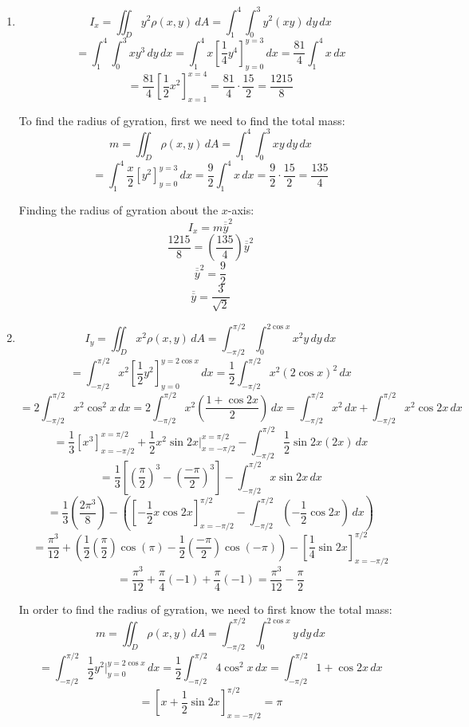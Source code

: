 \begin{Answer}[ref = moment]
\begin{enumerate}
\item $$I_x = \iint_{\textit{D}} y^2 \rho(x, y)\,dA = \int_1^4 \int_0^3 y^2 (xy) \,dy\,dx$$
$$= \int_1^4 \int_0^3 xy^3\,dy\,dx = \int_1^4 x \left[ \frac{1}{4} y^4 \right]_{y = 0}^{y = 3}\,dx = \frac{81}{4} \int_1^4 x\,dx$$
$$= \frac{81}{4} \left[ \frac{1}{2} x^2 \right]_{x = 1}^{x = 4} = \frac{81}{4} \cdot \frac{15}{2} = \frac{1215}{8}$$

To find the radius of gyration, first we need to find the total mass:
$$m = \iint_{\textit{D}} \rho(x, y)\,dA = \int_1^4 \int_0^3 xy\,dy\,dx$$
$$= \int_1^4 \frac{x}{2} \left[y^2 \right]_{y = 0}^{y = 3} \,dx = \frac{9}{2} \int_1^4 x\,dx = \frac{9}{2} \cdot \frac{15}{2} = \frac{135}{4}$$

Finding the radius of gyration about the $x$-axis:
$$I_x = m\overline{\overline{y}}^2$$
$$\frac{1215}{8} = \left( \frac{135}{4} \right) \overline{\overline{y}}^2$$
$$\overline{\overline{y}}^2 = \frac{9}{2}$$
$$\overline{\overline{y}} = \frac{3}{\sqrt{2}}$$

\item $$I_y = \iint_{\textit{D}} x^2 \rho(x, y)\,dA = \int_{-\pi/2}^{\pi/2} 
\int_0^{2\cos{x}} x^2y\,dy\,dx$$
$$= \int_{-\pi/2}^{\pi/2} x^2 \left[ \frac{1}{2}y^2 \right]_{y = 0}^{y = 2\cos{x
}}\,dx = \frac{1}{2} \int_{-\pi/2}^{\pi/2} x^2 \left(2\cos{x} \right)^2\,dx$$
$$= 2 \int_{-\pi/2}^{\pi/2} x^2 \cos^2{x}\,dx = 2\int_{-\pi/2}^{\pi/2} x^2 
\left( \frac{1 + \cos{2x}}{2} \right)\,dx = \int_{-\pi/2}^{\pi/2}x^2\,dx + \int
_{-\pi/2}^{\pi/2} x^2 \cos{2x} \,dx$$
$$= \frac{1}{3} \left[ x^3 \right]_{x = -\pi/2}^{x = \pi/2} + \frac{1}{2}x^2
\sin{2x}|_{x = -\pi/2}^{x = \pi/2} - \int_{-\pi/2}^{\pi/2} \frac{1}{2}\sin{2x} 
\left(2x \right)\,dx$$
$$= \frac{1}{3} \left[ \left( \frac{\pi}{2} \right)^3 - \left( \frac{-\pi}{2} 
\right)^3 \right] - \int_{-\pi/2}^{\pi/2} x \sin{2x}\,dx$$
$$ = \frac{1}{3} \left( \frac{2\pi^3}{8} \right) - \left( \left[ -\frac{1}{2}x
\cos{2x} \right]_{x = -\pi/2}^{\pi/2} - \int_{-\pi/2}^{\pi/2} (-\frac{1}{2}
\cos{2x}) \,dx\right)$$
$$ = \frac{\pi^3}{12} + \left( \frac{1}{2} \left( \frac{\pi}{2} \right) \cos{(
\pi)} - \frac{1}{2} \left( \frac{-\pi}{2} \right) \cos{(-\pi)} \right) - \left[
\frac{1}{4} \sin{2x} \right]_{x = -\pi/2}^{\pi/2}$$
$$= \frac{\pi^3}{12} + \frac{\pi}{4}(-1) + \frac{\pi}{4}(-1) = \frac{\pi^3}{12}
- \frac{\pi}{2}$$

In order to find the radius of gyration, we need to first know the total mass:
$$m = \iint_{\textit{D}} \rho(x, y)\,dA = \int_{-\pi/2}^{\pi/2} \int_{0}^{2
\cos{x}} y \,dy\,dx$$
$$= \int_{-\pi/2}^{\pi/2} \frac{1}{2}y^2|_{y = 0}^{y = 2\cos{x}}\,dx = 
\frac{1}{2} \int_{-\pi/2}^{\pi/2} 4\cos^2{x}\,dx = \int_{-\pi/2}^{\pi/2} 1 + 
\cos{2x}\,dx$$
$$= \left[x + \frac{1}{2}\sin{2x} \right]_{x = -\pi/2}^{\pi/2} = \pi$$


\end{enumerate}
\end{Answer}
